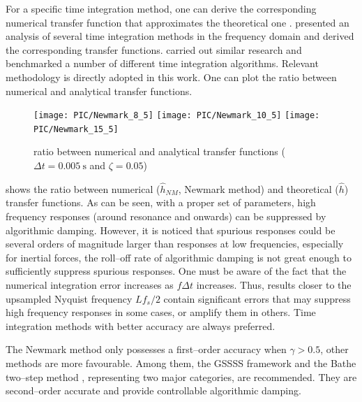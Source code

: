 For a specific time integration method, one can derive the corresponding numerical transfer function that approximates the theoretical one . \citet{Preumont1982} presented an analysis of several time integration methods in the frequency domain and derived the corresponding transfer functions. \citet{AriasTrujillo2012} carried out similar research and benchmarked a number of different time integration algorithms. Relevant methodology is directly adopted in this work. One can plot the ratio between numerical and analytical transfer functions.%
\begin{figure}[htb!]
\centering
\texttt{[image: PIC/Newmark\_8\_5]}
\texttt{[image: PIC/Newmark\_10\_5]}
\texttt{[image: PIC/Newmark\_15\_5]}
\caption{ratio between numerical and analytical transfer functions ($\Delta{}t=\SI{0.005}{\second}$ and $\zeta=0.05$)}\label{fig:newmark_alg_damping}
\end{figure}
 shows the ratio between numerical ($\hat{h}_{NM}$, Newmark method) and theoretical ($\hat{h}$) transfer functions. As can be seen, with a proper set of parameters, high frequency responses (around resonance and onwards) can be suppressed by algorithmic damping. However, it is noticed that spurious responses could be several orders of magnitude larger than responses at low frequencies, especially for inertial forces, the roll--off rate of algorithmic damping is not great enough to sufficiently suppress spurious responses. One must be aware of the fact that the numerical integration error increases as $f\Delta{}t$ increases. Thus, results closer to the upsampled Nyquist frequency $Lf_s/2$ contain significant errors that may suppress high frequency responses in some cases, or amplify them in others. Time integration methods with better accuracy are always preferred.
%

The Newmark method only possesses a first--order accuracy when $\gamma>0.5$, other methods are more favourable. Among them, the GSSSS framework \citep{Zhou2003,Zhou2006} and the Bathe two--step method \citep{Noh2019}, representing two major categories, are recommended. They are second--order accurate and provide controllable algorithmic damping.
